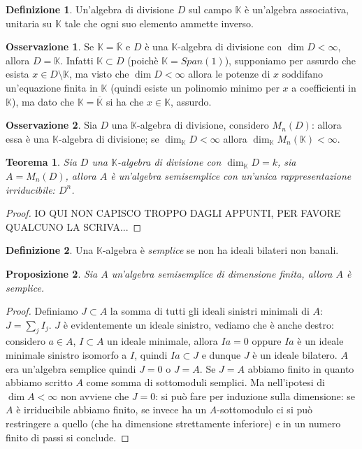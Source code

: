 \documentclass[11pt]{article}
\theoremstyle{plain}
\newtheorem{thm}{Teorema}[section]
\newtheorem{prop}[thm]{Proposizione}
\theoremstyle{definition}
\newtheorem{defn}{Definizione}[section]
\newtheorem*{rem}{Osservazione}
\theoremstyle{remark}
\newcommand{\K}{\mathbb{K}}
\begin{document}
\begin{defn}
	Un'algebra di divisione $D$ sul campo $\K$ è un'algebra associativa, unitaria su $\K$ tale che ogni suo elemento ammette inverso.
\end{defn}

\begin{rem}
	Se $\K=\overline{\K}$ e $D$ è una $\K$-algebra di divisione con $\dim D<\infty$, allora $D=\K$. Infatti $\K\subset D$ (poichè $\K=Span(1)$), supponiamo per assurdo che esista $x\in D\setminus \K$, ma visto che $\dim D < \infty$ allora le potenze di $x$ soddifano un'equazione finita in $\K$ (quindi esiste un polinomio minimo per $x$ a coefficienti in $\K$), ma dato che $\K=\overline{\K}$ si ha che $x\in \K$, assurdo.
\end{rem}

\begin{rem}
	Sia $D$ una $\K$-algebra di divisione, considero $M_n(D)$: allora essa è una $\K$-algebra di divisione; se $\dim_{\K}D<\infty$ allora $\dim_{\K} M_n(\K) < \infty$.
\end{rem}

\begin{thm}
	Sia $D$ una $\K$-algebra di divisione con $\dim_{\K} D=k$, sia $A=M_n(D)$, allora $A$ è un'algebra semisemplice con un'unica rappresentazione irriducibile: $D^n$.
\end{thm}

\begin{proof}
	IO QUI NON CAPISCO TROPPO DAGLI APPUNTI, PER FAVORE QUALCUNO LA SCRIVA...
\end{proof}


\begin{defn}
	Una $\K$-algebra è \textit{semplice} se non ha ideali bilateri non banali.
\end{defn}

\begin{prop}
	Sia $A$ un'algebra semisemplice di dimensione finita, allora $A$ è semplice.
\end{prop}
\begin{proof}
	Definiamo $J\subset A$ la somma di tutti gli ideali sinistri minimali di $A$: $J=\sum_j I_j$. $J$ è evidentemente un ideale sinistro, vediamo che è anche destro: considero $a\in A$, $I\subset A$ un ideale minimale, allora $Ia = 0$ oppure $Ia$ è un ideale minimale sinistro isomorfo a $I$, quindi $Ia\subset J$ e dunque $J$ è un ideale bilatero. $A$ era un'algebra semplice quindi $J=0$ o $J=A$. Se $J=A$ abbiamo finito in quanto abbiamo scritto $A$ come somma di sottomoduli semplici. Ma nell'ipotesi di $\dim A <\infty$ non avviene che $J=0$: si può fare per induzione sulla dimensione: se $A$ è irriducibile abbiamo finito, se invece ha un $A$-sottomodulo ci si può restringere a quello (che ha dimensione strettamente inferiore) e in un numero finito di passi si conclude.
\end{proof}
\end{document}
